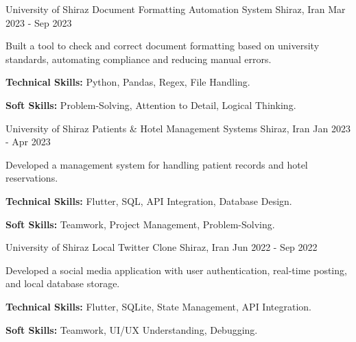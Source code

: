 

\begin{cventries}

  \cventry
    {University of Shiraz} %
    {Document Formatting Automation System} %
    {Shiraz, Iran} %
    {Mar 2023 - Sep 2023} %
    {
      \begin{cvitems} %
        \item {Built a tool to check and correct document formatting based on university standards, automating compliance and reducing manual errors.}
        \item {\textbf{Technical Skills:} Python, Pandas, Regex, File Handling.}
        \item {\textbf{Soft Skills:} Problem-Solving, Attention to Detail, Logical Thinking.}
      \end{cvitems}
    }

    \cventry
    {University of Shiraz} %
    {Patients \& Hotel Management Systems} %
    {Shiraz, Iran} %
    {Jan 2023 - Apr 2023} %
    {
      \begin{cvitems} %
        \item {Developed a management system for handling patient records and hotel reservations.}
        \item {\textbf{Technical Skills:} Flutter, SQL, API Integration, Database Design.}
        \item {\textbf{Soft Skills:} Teamwork, Project Management, Problem-Solving.}
      \end{cvitems}
    }

    \cventry
    {University of Shiraz} %
    {Local Twitter Clone} %
    {Shiraz, Iran} %
    {Jun 2022 - Sep 2022} %
    {
      \begin{cvitems} %
        \item {Developed a social media application with user authentication, real-time posting, and local database storage.}
        \item {\textbf{Technical Skills:} Flutter, SQLite, State Management, API Integration.}
        \item {\textbf{Soft Skills:} Teamwork, UI/UX Understanding, Debugging.}
      \end{cvitems}
    }

\end{cventries}
